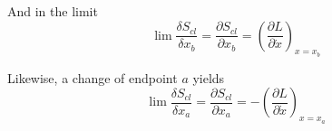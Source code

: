 \documentclass[12pt]{article}
\begin{document}
And in the limit
\begin{equation*}
\lim\frac{\delta S_{cl}}{\delta x_b}=\frac{\partial S_{cl}}{\partial x_b}
=\left(\frac{\partial L}{\partial\dot x}\right)_{x=x_b}
\end{equation*}

Likewise, a change of endpoint $a$ yields
\begin{equation*}
\lim\frac{\delta S_{cl}}{\delta x_a}=\frac{\partial S_{cl}}{\partial x_a}
=-\left(\frac{\partial L}{\partial\dot x}\right)_{x=x_a}
\end{equation*}
\end{document}
